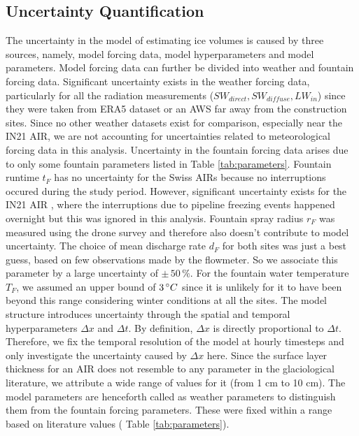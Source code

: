 \subsection{Uncertainty Quantification}

The uncertainty in the model of estimating ice volumes is caused by three sources, namely, model forcing
data, model hyperparameters and model parameters. Model forcing data can further be divided into weather and
fountain forcing data. Significant uncertainty exists in the weather forcing data, particularly for all the
radiation measurements ($SW_{direct}, SW_{diffuse}, LW_{in}$) since they were taken from ERA5 dataset or an
\ac{AWS}
far away from the construction sites. Since no other weather datasets exist for comparison, especially near the
IN21 AIR, we are not accounting for uncertainties related to meteorological forcing data in this analysis.
Uncertainty in the fountain forcing data arises due to only some fountain parameters listed in Table
\ref{tab:parameters}. Fountain runtime $t_F$ has no uncertainty for the Swiss \ac{AIRs} because no interruptions
occured during the study period. However, significant uncertainty exists for the IN21 AIR , where the
interruptions due to pipeline freezing events happened overnight but this was ignored in this analysis. Fountain
spray radius $r_F$ was measured using the drone survey and therefore also doesn't contribute to model
uncertainty. The choice of mean discharge rate $d_F$ for both sites was just a best guess, based on few observations made by the
flowmeter. So we associate this parameter by a large uncertainty of $\pm \,50\, \%$. For the fountain water
temperature $T_F$, we assumed an upper bound of $3\, ^{\circ} C$ since it is unlikely for it to have been beyond
this range considering winter conditions at all the sites. The model structure introduces uncertainty through
the spatial and temporal hyperparameters $\Delta x$ and $\Delta t$. By definition, $\Delta x$ is directly
proportional to $\Delta t$. Therefore, we fix the temporal resolution of the model at hourly timesteps and only
investigate the uncertainty caused by $\Delta x$ here. Since the surface layer thickness for an AIR does not
resemble to any parameter in the glaciological literature, we attribute a wide range of values for it (from 1 cm
to 10 cm). The model parameters are henceforth called as weather parameters to distinguish them from the
fountain forcing parameters. These were fixed within a range based on literature values ( Table
\ref{tab:parameters}). 

